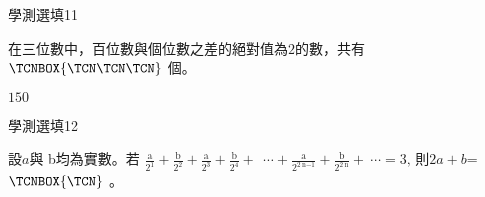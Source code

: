 \begin{QUESTIONS}
    \begin{QUESTION}
        \begin{ExamInfo}{87}{學測}{選填}{11}
        \end{ExamInfo}
        \begin{ExamAnsRateInfo}{}{}{}{}
        \end{ExamAnsRateInfo}
        \begin{QBODY}
            在三位數中，百位數與個位數之差的絕對值為$2$的數，共有$\TCNBOX{\TCN\TCN\TCN}$
            個。
    
        \end{QBODY}
        \begin{QFROMS}
        \end{QFROMS}
        \begin{QTAGS}\end{QTAGS}
        \begin{QANS}
            $150$
        \end{QANS}
        \begin{QSOLLIST}
        \end{QSOLLIST}
        \begin{QEMPTYSPACE}
        \end{QEMPTYSPACE}
    \end{QUESTION}
    \begin{QUESTION}
        \begin{ExamInfo}{87}{學測}{選填}{12}
        \end{ExamInfo}
        \begin{ExamAnsRateInfo}{}{}{}{}
        \end{ExamAnsRateInfo}
        \begin{QBODY}
            設$a$與 b均為實數。若
            $\frac{\text{a}}{{{\text{2}}^{\text{1}}}}+\frac{\text{b}}{{{\text{2}}^{\text{2}}}}+\frac{\text{a}}{{{\text{2}}^{\text{3}}}}+\frac{\text{b}}{{{\text{2}}^{\text{4}}}}+\ \ \cdots +\frac{\text{a}}{{{\text{2}}^{\text{2}\ \text{n}-\text{1}}}}+\frac{\text{b}}{{{\text{2}}^{\text{2}\ \text{n}}}}+\ \cdots =\text{3,}$
            則$2a+b$=    $\TCNBOX{\TCN}$     。
            

\end{QBODY}
\end{QUESTION}
\end{QUESTIONS}
